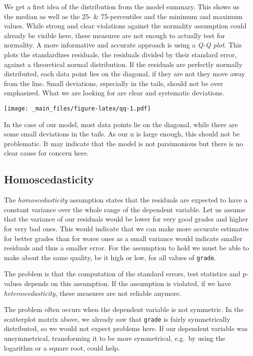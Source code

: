 \documentclass[
]{book}
\begin{document}
We get a first idea of the distribution from the model summary. This shows us
the median as well as the 25- \& 75-percentiles and the minimum and maximum values.
While strong and clear violations against the normality assumption could already
be visible here, these measures are not enough to actually test for normality.
A more informative and accurate approach is using a \emph{Q-Q plot}. This plots the
standardizes residuals, the residuals divided by their standard error, against
a theoretical normal distribution. If the residuals are perfectly normally
distributed, each data point lies on the diagonal, if they are not they move
away from the line. Small deviations, especially in the tails, should not be
over emphasized. What we are looking for are clear and systematic deviations.

\texttt{[image: \_main\_files/figure-latex/qq-1.pdf]}

In the case of our model, most data points lie on the diagonal, while there are
some small deviations in the tails. As our n is large enough, this should not be
problematic. It may indicate that the model is not parsimonious but there is
no clear cause for concern here.

\hypertarget{homoscedasticity}{%
\subsection{Homoscedasticity}\label{homoscedasticity}}

The \emph{homoscedasticity} assumption states that the residuals are expected to have
a constant variance over the whole range of the dependent variable. Let us
assume that the variance of our residuals would be lower for very good grades
and higher for very bad ones. This would indicate that we can make more accurate
estimates for better grades than for worse ones as a small variance would
indicate smaller residuals and thus a smaller error. For the assumption to hold
we must be able to make about the same quality, be it high or low, for all
values of \texttt{grade}.

The problem is that the computation of the standard errors, test statistics and
p-values depends on this assumption. If the assumption is violated, if we have
\emph{heteroscedasticity}, these measures are not reliable anymore.

The problem often occurs when the dependent variable is not symmetric. In the
scatterplot matrix above, we already saw that \texttt{grade} is fairly symmetrically
distributed, so we would not expect problems here. If our dependent variable was
unsymmetrical, transforming it to be more symmetrical, e.g.~by using the
logarithm or a square root, could help.
\end{document}

